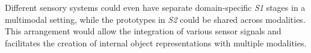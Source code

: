 Different sensory systems could even have separate domain-specific \emph{S1} stages in a multimodal setting, while the prototypes in \emph{S2} could be shared across modalities. This arrangement would allow the integration of various sensor signals and facilitates the creation of internal object representations with multiple modalities.